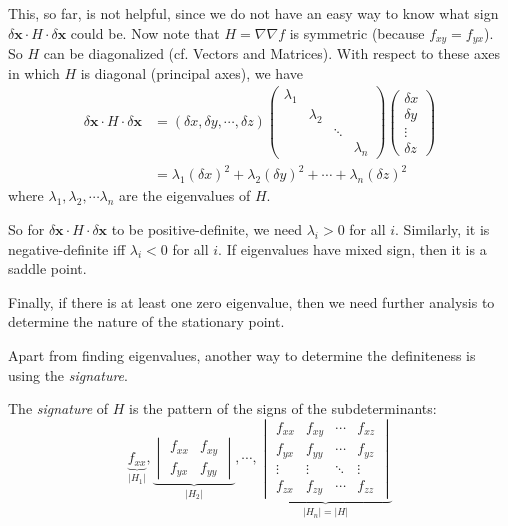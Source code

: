 \documentclass[a4paper]{article}
\begin{document}
This, so far, is not helpful, since we do not have an easy way to know what sign $\delta \mathbf{x}\cdot H\cdot \delta \mathbf{x}$ could be. Now note that $H = \nabla\nabla f$ is symmetric (because $f_{xy} = f_{yx}$). So $H$ can be diagonalized (cf. Vectors and Matrices). With respect to these axes in which $H$ is diagonal (principal axes), we have
\begin{align*}
  \delta\mathbf{x}\cdot H\cdot \delta\mathbf{x} &= (\delta x, \delta y, \cdots, \delta z)
  \begin{pmatrix}
    \lambda_1\\
    &\lambda_2\\
    &&\ddots\\
    &&&\lambda_n
  \end{pmatrix}
  \begin{pmatrix}
    \delta x\\\delta y\\\vdots\\\delta z
  \end{pmatrix}\\
  &= \lambda_1(\delta x)^2 + \lambda_2 (\delta y)^2 + \cdots + \lambda_n(\delta z)^2
\end{align*}
where $\lambda_1, \lambda_2, \cdots \lambda_n$ are the eigenvalues of $H$.

So for $\delta \mathbf{x}\cdot H\cdot \delta \mathbf{x}$ to be positive-definite, we need $\lambda_i > 0$ for all $i$. Similarly, it is negative-definite iff $\lambda_i < 0$ for all $i$. If eigenvalues have mixed sign, then it is a saddle point.

Finally, if there is at least one zero eigenvalue, then we need further analysis to determine the nature of the stationary point.

Apart from finding eigenvalues, another way to determine the definiteness is using the \emph{signature}.
\begin{defi}
  The \emph{signature} of $H$ is the pattern of the signs of the subdeterminants:
  \[
    \underbrace{f_{xx}}_{|H_1|},
    \underbrace{
      \begin{vmatrix}
        f_{xx} & f_{xy}\\
        f_{yx} & f_{yy}
      \end{vmatrix}}_{|H_2|},\cdots,
    \underbrace{\begin{vmatrix}
      f_{xx} & f_{xy} & \cdots & f_{xz}\\
      f_{yx} & f_{yy} & \cdots & f_{yz}\\
      \vdots & \vdots & \ddots & \vdots\\
      f_{zx} & f_{zy} & \cdots & f_{zz}
    \end{vmatrix}}_{|H_n| = |H|}
  \]
\end{defi}
\end{document}
